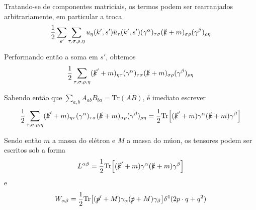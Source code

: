 Tratando-se de componentes matriciais, os termos podem ser rearranjados arbitrariamente, em particular a troca
    \begin{equation*}
        \dfrac{1}{2} \sum_{s'} \sum_{\tau,\sigma,\rho,\eta} 
        u_{\eta}(k',s') \bar{u}_{\tau}(k',s') 
        (\gamma^{\alpha})_{\tau\sigma} 
        (\slashed{k} + m)_{\sigma\rho}
        (\gamma^{\beta})_{\rho\eta}
    \end{equation*}

Performando então a soma em $s'$, obtemos
    \begin{equation*}
        \dfrac{1}{2} \sum_{\tau,\sigma,\rho,\eta} 
        (\slashed{k}' + m)_{\eta\tau} 
        (\gamma^{\alpha})_{\tau\sigma} 
        (\slashed{k} + m)_{\sigma\rho}
        (\gamma^{\beta})_{\rho\eta}
    \end{equation*}

Sabendo então que $\displaystyle\sum_{a,b}A_{ab}B_{ba} = \text{Tr}(AB)$, é imediato escrever
    \begin{equation*}
        \dfrac{1}{2} \sum_{\tau,\sigma,\rho,\eta} 
        (\slashed{k}' + m)_{\eta\tau} 
        (\gamma^{\alpha})_{\tau\sigma} 
        (\slashed{k} + m)_{\sigma\rho}
        (\gamma^{\beta})_{\rho\eta} = 
        \dfrac{1}{2}\text{Tr}\qty[
            (\slashed{k}' + m) 
            \gamma^{\alpha}
            (\slashed{k} + m)
            \gamma^{\beta}
        ]
    \end{equation*}

Sendo então $m$ a massa do elétron e $M$ a massa do múon, os tensores podem ser escritos sob a forma
    \begin{equation*}
        L^{\alpha\beta} = \dfrac{1}{2} \text{Tr}\qty[
            (\slashed{k}' + m)
            \gamma^{\alpha}
            (\slashed{k} + m)
            \gamma^{\beta}
        ]
    \end{equation*}
e
    \begin{equation*}
        W_{\alpha\beta} = \dfrac{1}{2} \text{Tr}\qty[
            (\slashed{p}' + M)
            \gamma_{\alpha}
            (\slashed{p} + M)
            \gamma_{\beta}
        ]\delta^{4}(2p\cdot q + q^{2})
    \end{equation*}

